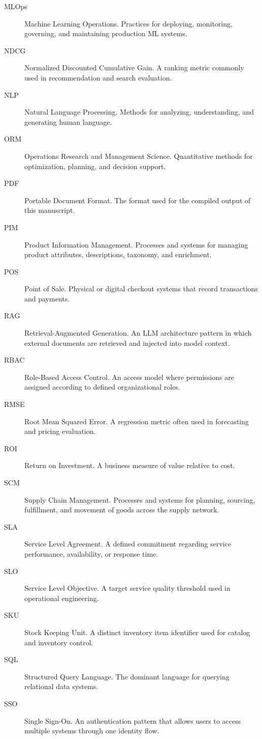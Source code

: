 \begin{description}
  \item[MLOps] Machine Learning Operations. Practices for deploying, monitoring, governing, and maintaining production ML systems.
  \item[NDCG] Normalized Discounted Cumulative Gain. A ranking metric commonly used in recommendation and search evaluation.
  \item[NLP] Natural Language Processing. Methods for analyzing, understanding, and generating human language.
  \item[ORM] Operations Research and Management Science. Quantitative methods for optimization, planning, and decision support.
  \item[PDF] Portable Document Format. The format used for the compiled output of this manuscript.
  \item[PIM] Product Information Management. Processes and systems for managing product attributes, descriptions, taxonomy, and enrichment.
  \item[POS] Point of Sale. Physical or digital checkout systems that record transactions and payments.
  \item[RAG] Retrieval-Augmented Generation. An LLM architecture pattern in which external documents are retrieved and injected into model context.
  \item[RBAC] Role-Based Access Control. An access model where permissions are assigned according to defined organizational roles.
  \item[RMSE] Root Mean Squared Error. A regression metric often used in forecasting and pricing evaluation.
  \item[ROI] Return on Investment. A business measure of value relative to cost.
  \item[SCM] Supply Chain Management. Processes and systems for planning, sourcing, fulfillment, and movement of goods across the supply network.
  \item[SLA] Service Level Agreement. A defined commitment regarding service performance, availability, or response time.
  \item[SLO] Service Level Objective. A target service quality threshold used in operational engineering.
  \item[SKU] Stock Keeping Unit. A distinct inventory item identifier used for catalog and inventory control.
  \item[SQL] Structured Query Language. The dominant language for querying relational data systems.
  \item[SSO] Single Sign-On. An authentication pattern that allows users to access multiple systems through one identity flow.

\end{description}
